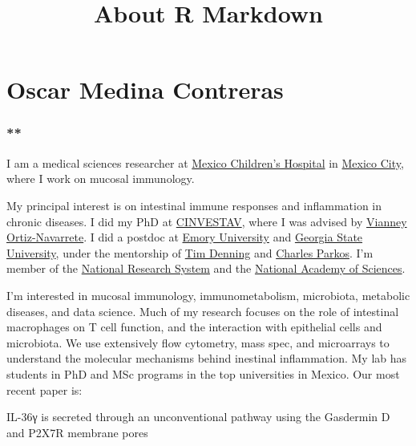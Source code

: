 \documentclass[
]{article}
\title{About R Markdown}
\author{}
\date{\vspace{-2.5em}}
\begin{document}
\maketitle

\hypertarget{oscar-medina-contreras}{%
\section{\texorpdfstring{\textbf{Oscar Medina
Contreras}}{Oscar Medina Contreras}}\label{oscar-medina-contreras}}

\hypertarget{section}{%
\subsubsection{**}\label{section}}

I am a medical sciences researcher at
\href{http://www.himfg.edu.mx}{Mexico Children's Hospital} in
\href{https://en.wikipedia.org/wiki/Mexico_City}{Mexico City}, where I
work on mucosal immunology.

My principal interest is on intestinal immune responses and inflammation
in chronic diseases. I did my PhD at
\href{https://www.cinvestav.mx}{CINVESTAV}, where I was advised by
\href{https://biomol.cinvestav.mx/Personal-Académico/Dr-Vianney-Ortiz-Navarrete}{Vianney
Ortiz-Navarrete}. I did a postdoc at
\href{https://www.emory.edu/home/index.html}{Emory University} and
\href{https://www.gsu.edu}{Georgia State University}, under the
mentorship of
\href{https://ursa.research.gsu.edu/profile/denning-tim}{Tim Denning}
and
\href{https://medicine.umich.edu/dept/immunology/charles-parkos-md-phd}{Charles
Parkos}. I'm member of the
\href{https://conacyt.mx/sistema-nacional-de-investigadores/}{National
Research System} and the
\href{https://amc.edu.mx/amc/index.php?option=com_content\&view=article\&id=59\&Itemid=79}{National
Academy of Sciences}.

I'm interested in mucosal immunology, immunometabolism, microbiota,
metabolic diseases, and data science. Much of my research focuses on the
role of intestinal macrophages on T cell function, and the interaction
with epithelial cells and microbiota. We use extensively flow cytometry,
mass spec, and microarrays to understand the molecular mechanisms behind
inestinal inflammation. My lab has students in PhD and MSc programs in
the top universities in Mexico. Our most recent paper is:

IL-36γ is secreted through an unconventional pathway using the Gasdermin
D and P2X7R membrane pores
\end{document}
